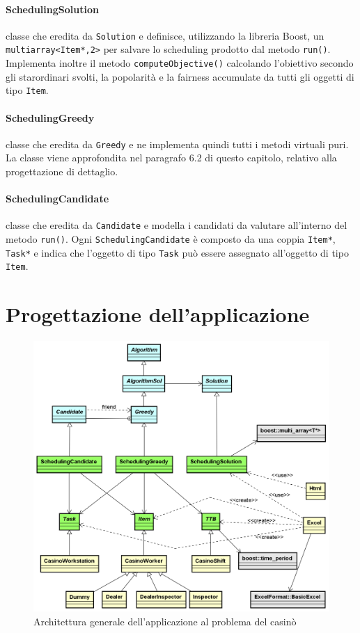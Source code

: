 \paragraph{SchedulingSolution} classe che eredita da \texttt{Solution} e definisce, utilizzando la libreria Boost, un \texttt{multi\textunderscore array<Item*,2>} per salvare lo scheduling prodotto dal metodo \texttt{run()}. Implementa inoltre il metodo \texttt{computeObjective()} calcolando l'obiettivo secondo gli starordinari svolti, la popolarità e la fairness accumulate da tutti gli oggetti di tipo \texttt{Item}.
\paragraph{SchedulingGreedy} classe che eredita da \texttt{Greedy} e ne implementa quindi tutti i metodi virtuali puri. La classe viene approfondita nel paragrafo 6.2 di questo capitolo, relativo alla progettazione di dettaglio.
\paragraph{SchedulingCandidate} classe che eredita da \texttt{Candidate} e modella i candidati da valutare all'interno del metodo \texttt{run()}. Ogni \texttt{SchedulingCandidate} è composto da una coppia \texttt{Item*}, \texttt{Task*} e indica che l'oggetto di tipo \texttt{Task} può essere assegnato all'oggetto di tipo \texttt{Item}.
\section{Progettazione dell'applicazione}
\begin{figure}[!h]
    \begin{widepage}
        \includegraphics[width=14.9cm,keepaspectratio]{../immagini/progettazione/applicazione.png}
        \caption{Architettura generale dell'applicazione al problema del casinò}
    \end{widepage}
\end{figure}
\FloatBarrier
\noindent
